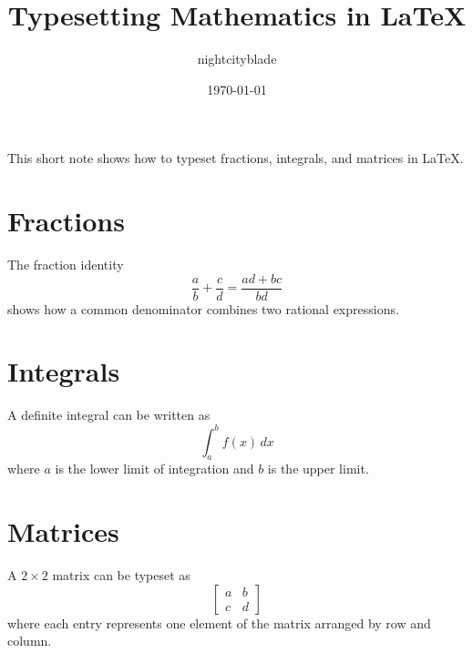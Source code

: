 \documentclass{article}
\title{Typesetting Mathematics in LaTeX}
\author{nightcityblade}
\date{\today}
\begin{document}
\maketitle

This short note shows how to typeset fractions, integrals, and matrices in LaTeX.

\section*{Fractions}
The fraction identity
\[
\frac{a}{b} + \frac{c}{d} = \frac{ad + bc}{bd}
\]
shows how a common denominator combines two rational expressions.

\section*{Integrals}
A definite integral can be written as
\[
\int_a^b f(x)\,dx
\]
where $a$ is the lower limit of integration and $b$ is the upper limit.

\section*{Matrices}
A $2 \times 2$ matrix can be typeset as
\[
\begin{bmatrix}
  a & b \\
  c & d
\end{bmatrix}
\]
where each entry represents one element of the matrix arranged by row and column.
\end{document}
